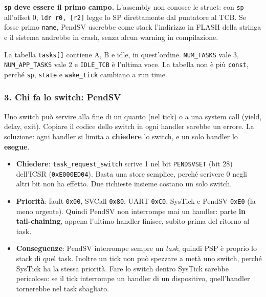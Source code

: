 \textbf{\texttt{sp} deve essere il primo campo.} L'assembly non conosce le struct: con \texttt{sp} all'offset 0, \texttt{ldr r0, [r2]} legge lo SP direttamente dal puntatore al TCB. Se fosse primo \texttt{name}, PendSV userebbe come stack l'indirizzo in FLASH della stringa e il sistema andrebbe in crash, senza alcun warning in compilazione.

La tabella \texttt{tasks[]} contiene A, B e idle, in quest'ordine. \texttt{NUM\_TASKS} vale 3, \texttt{NUM\_APP\_TASKS} vale 2 e \texttt{IDLE\_TCB} è l'ultima voce. La tabella non è più \texttt{const}, perché \texttt{sp}, \texttt{state} e \texttt{wake\_tick} cambiano a run time.

\subsubsection*{3. Chi fa lo switch: PendSV}
Uno switch può servire alla fine di un quanto (nel tick) o a una system call (yield, delay, exit). Copiare il codice dello switch in ogni handler sarebbe un errore. La soluzione: ogni handler si limita a \textbf{chiedere} lo switch, e un solo handler lo \textbf{esegue}.
\begin{itemize}
    \item \textbf{Chiedere}: \texttt{task\_request\_switch} scrive 1 nel bit \texttt{PENDSVSET} (bit 28) dell'ICSR (\texttt{0xE000ED04}). Basta una store semplice, perché scrivere 0 negli altri bit non ha effetto. Due richieste insieme costano un solo switch.
    \item \textbf{Priorità}: fault \texttt{0x00}, SVCall \texttt{0x80}, UART \texttt{0xC0}, SysTick e PendSV \texttt{0xE0} (la meno urgente). Quindi PendSV non interrompe mai un handler: parte \textbf{in tail-chaining}, appena l'ultimo handler finisce, subito prima del ritorno al task.
    \item \textbf{Conseguenze}: PendSV interrompe sempre un \emph{task}, quindi PSP è proprio lo stack di quel task. Inoltre un tick non può spezzare a metà uno switch, perché SysTick ha la stessa priorità. Fare lo switch dentro SysTick sarebbe pericoloso: se il tick interrompe un handler di un dispositivo, quell'handler tornerebbe nel task sbagliato.
\end{itemize}


